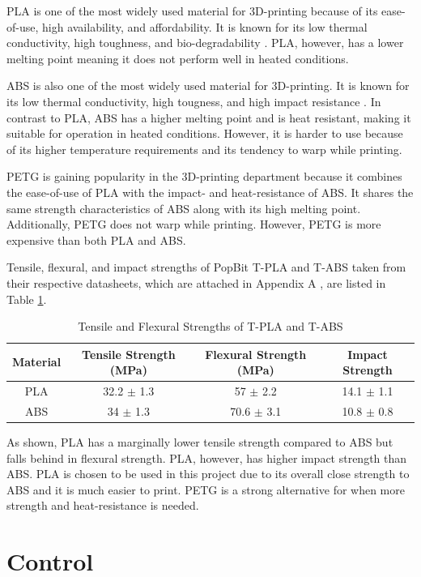 \documentclass[english]{upeeei}
\providecommand{\tabularnewline}{\\}
\begin{document}
PLA is one of the most widely used material for 3D-printing because of its ease-of-use, high availability, and affordability. It is known for its low thermal conductivity, high toughness, and bio-degradability \cite{plaabships}. PLA, however, has a lower melting point meaning it does not perform well in heated conditions.

ABS is also one of the most widely used material for 3D-printing. It is known for its low thermal conductivity, high tougness, and high impact resistance \cite{plaabships}. In contrast to PLA, ABS has a higher melting point and is heat resistant, making it suitable for operation in heated conditions. However, it is harder to use because of its higher temperature requirements and its tendency to warp while printing.

PETG is gaining popularity in the 3D-printing department because it combines the ease-of-use of PLA with the impact- and heat-resistance of ABS. It shares the same strength characteristics of ABS along with its high melting point. Additionally, PETG does not warp while printing. However, PETG is more expensive than both PLA and ABS.

Tensile, flexural, and impact strengths of PopBit T-PLA and T-ABS taken from their respective datasheets, which are attached in Appendix A \cite{tpla, tabs}, are listed in Table \ref{tab:material-strengths}.

\begin{table}[H]
\caption{Tensile and Flexural Strengths of T-PLA and T-ABS\label{tab:material-strengths}}

\centering{}
\begin{tabular}{|c|c|c|c|}
\hline 
Material & Tensile Strength (MPa) & Flexural Strength (MPa) & Impact Strength\tabularnewline
\hline 
\hline 
PLA & 32.2 $\pm$ 1.3 & 57 $\pm$ 2.2 & 14.1 $\pm$ 1.1 \tabularnewline
\hline 
ABS & 34 $\pm$ 1.3 & 70.6 $\pm$ 3.1 & 10.8 $\pm$ 0.8 \tabularnewline
\hline 
\hline 
\end{tabular}
\end{table}

As shown, PLA has a marginally lower tensile strength compared to ABS but falls behind in flexural strength. PLA, however, has higher impact strength than ABS. PLA is chosen to be used in this project due to its overall close strength to ABS and it is much easier to print. PETG is a strong alternative for when more strength and heat-resistance is needed.

\section{Control}
\end{document}
